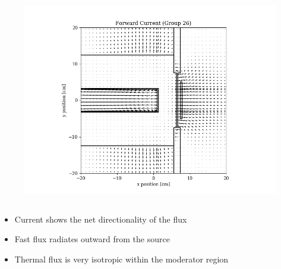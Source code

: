 \documentclass[t]{beamer}
\begin{document}
\begin{frame}
\begin{columns}
\begin{figure}
      \includegraphics[trim={0.7in 0.15in 1.05in 0.4in},clip,scale=0.36]{images/current_fwd_g26.png}
    \end{figure}
  \end{columns}
  \begin{itemize}
    \item Current shows the net directionality of the flux
    \item Fast flux radiates outward from the source
    \item Thermal flux is very isotropic within the moderator region
  \end{itemize}
\end{frame}
\end{document}
